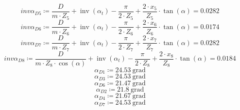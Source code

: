 \documentclass{article}
\newcommand{\defeq}{\coloneq} %
\begin{document}
\begin{equation*}
\textit{invα}_{\textit{D5}} \defeq \frac{D}{m \cdot \textit{Z}_{\textit{5}}}+\operatorname{inv} \left( α_{t} \right)-\frac{{\pi}}{2 \cdot \textit{Z}_{\textit{5}}}+\frac{2 \cdot \textit{x}_{\textit{5}}}{\textit{Z}_{\textit{5}}} \cdot \tan \left( {\alpha} \right) = {0.0282}
\end{equation*}
\begin{equation*}
\textit{invα}_{\textit{D6}} \defeq \frac{D}{m \cdot \textit{Z}_{\textit{6}}}+\operatorname{inv} \left( α_{t} \right)-\frac{{\pi}}{2 \cdot \textit{Z}_{\textit{6}}}+\frac{2 \cdot \textit{x}_{\textit{6}}}{\textit{Z}_{\textit{6}}} \cdot \tan \left( {\alpha} \right) = {0.0174}
\end{equation*}
\begin{equation*}
\textit{invα}_{\textit{D7}} \defeq \frac{D}{m \cdot \textit{Z}_{\textit{7}}}+\operatorname{inv} \left( α_{t} \right)-\frac{{\pi}}{2 \cdot \textit{Z}_{\textit{7}}}+\frac{2 \cdot \textit{x}_{\textit{7}}}{\textit{Z}_{\textit{7}}} \cdot \tan \left( {\alpha} \right) = {0.0282}
\end{equation*}
\begin{equation*}
\textit{invα}_{\textit{D8}} \defeq \frac{D}{m \cdot \textit{Z}_{\textit{8}} \cdot \cos \left( {\alpha} \right)}+\operatorname{inv} \left( α_{t} \right)-\frac{{\pi}}{2 \cdot \textit{Z}_{\textit{8}}}+\frac{2 \cdot \textit{x}_{\textit{8}}}{\textit{Z}_{\textit{8}}} \cdot \tan \left( {\alpha} \right) = {0.0184}
\end{equation*}
\begin{equation*}
\textit{α}_{\textit{D1}} \defeq 24.53 \: \mathrm{grad}
\end{equation*}
\begin{equation*}
\textit{α}_{\textit{D3}} \defeq 24.53 \: \mathrm{grad}
\end{equation*}
\begin{equation*}
\textit{α}_{\textit{D6}} \defeq 21.47 \: \mathrm{grad}
\end{equation*}
\begin{equation*}
\textit{α}_{\textit{D2}} \defeq 21.8 \: \mathrm{grad}
\end{equation*}
\begin{equation*}
\textit{α}_{\textit{D4}} \defeq 21.67 \: \mathrm{grad}
\end{equation*}
\begin{equation*}
\textit{α}_{\textit{D7}} \defeq 24.53 \: \mathrm{grad}
\end{equation*}
\end{document}
